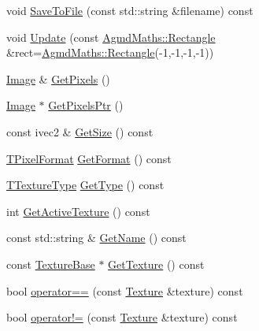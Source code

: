 \begin{DoxyCompactItemize}
void \hyperlink{class_agmd_1_1_texture_a686211a47844dbfcb765f26c09d4c562}{Save\+To\+File} (const std\+::string \&filename) const 
\item 
void \hyperlink{class_agmd_1_1_texture_a9631a110c75015db8705f1bb0378723d}{Update} (const \hyperlink{class_agmd_maths_1_1_rectangle}{Agmd\+Maths\+::\+Rectangle} \&rect=\hyperlink{class_agmd_maths_1_1_rectangle}{Agmd\+Maths\+::\+Rectangle}(-\/1,-\/1,-\/1,-\/1))
\item 
\hyperlink{class_agmd_1_1_image}{Image} \& \hyperlink{class_agmd_1_1_texture_a42ba02b636c409d71aa6888b13adc677}{Get\+Pixels} ()
\item 
\hyperlink{class_agmd_1_1_image}{Image} $\ast$ \hyperlink{class_agmd_1_1_texture_a046c0b2f42f39f64ef74def7f1f05233}{Get\+Pixels\+Ptr} ()
\item 
const ivec2 \& \hyperlink{class_agmd_1_1_texture_ad0bc7071cb4a1d0c7a0a68200c815c5d}{Get\+Size} () const 
\item 
\hyperlink{namespace_agmd_afc48fd9fa5dccb4c5621c052bfd1a7ec}{T\+Pixel\+Format} \hyperlink{class_agmd_1_1_texture_a14d772d75da1436a9987f80da0e81532}{Get\+Format} () const 
\item 
\hyperlink{namespace_agmd_a7036bece09449a930cfec410f75e85f4}{T\+Texture\+Type} \hyperlink{class_agmd_1_1_texture_a145fb653b1aedb53ab3e0702edd8954d}{Get\+Type} () const 
\item 
int \hyperlink{class_agmd_1_1_texture_a2e31e968f8e615800e98d7e77bf4a3da}{Get\+Active\+Texture} () const 
\item 
const std\+::string \& \hyperlink{class_agmd_1_1_texture_aeb19b9712c2fffaa9eb1391cf6ca2eec}{Get\+Name} () const 
\item 
const \hyperlink{class_agmd_1_1_texture_base}{Texture\+Base} $\ast$ \hyperlink{class_agmd_1_1_texture_a62313bf0a9d534c64ae9071d4dc0f200}{Get\+Texture} () const 
\item 
bool \hyperlink{class_agmd_1_1_texture_ab7153c28be2c58b62b7eb88d7e20f83a}{operator==} (const \hyperlink{class_agmd_1_1_texture}{Texture} \&texture) const 
\item 
bool \hyperlink{class_agmd_1_1_texture_a0e5814c8c548faeb35cc93b56404b7a2}{operator!=} (const \hyperlink{class_agmd_1_1_texture}{Texture} \&texture) const 
\end{DoxyCompactItemize}
